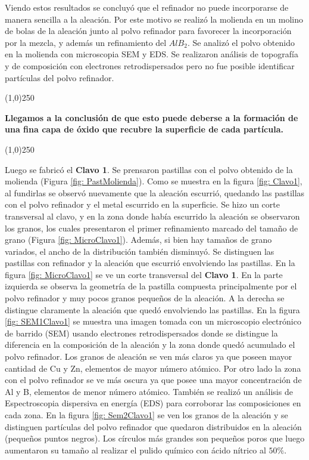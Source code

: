 \documentclass[a4paper,12pt,fleqn,twoside,openany]{book}
\begin{document}
Viendo estos resultados se concluyó que el refinador no puede incorporarse de manera sencilla a la aleación. Por este motivo se realizó la molienda en un molino de bolas de la aleación junto al polvo refinador para favorecer la incorporación por la mezcla, y además un refinamiento del $AlB_2$. Se analizó el polvo obtenido en la molienda con microscopia SEM y EDS. Se realizaron análisis de topografía y de composición con electrones retrodispersados pero no fue posible identificar partículas del polvo refinador. 

\begin{center}
\line(1,0){250}
\end{center}

\textbf{Llegamos a la conclusión de que esto puede deberse a la formación de una fina capa de óxido que recubre la superficie de cada partícula.} 

\begin{center}
\line(1,0){250}
\end{center}


Luego se fabricó el \textbf{Clavo 1}. Se prensaron pastillas con el polvo obtenido de la molienda (Figura \ref{fig: PastMolienda}). Como se muestra en la figura \ref{fig: Clavo1}, al fundirlas se observó nuevamente que la aleación escurrió, quedando las pastillas con el polvo refinador y el metal escurrido en la superficie. Se hizo un corte transversal al clavo, y en la zona donde había escurrido la aleación se observaron los granos, los cuales presentaron el primer refinamiento marcado del tamaño de grano (Figura \ref{fig: MicroClavo1}). Además, si bien hay tamaños de grano variados, el ancho de la distribución también disminuyó.  Se distinguen las pastillas con refinador y la aleación que escurrió envolviendo las pastillas. En la figura \ref{fig: MicroClavo1} se ve un corte transversal del \textbf{Clavo 1}. En la parte izquierda se observa la geometría de la pastilla compuesta principalmente por el polvo refinador y muy pocos granos pequeños de la aleación. A la derecha se distingue claramente la aleación que quedó envolviendo las pastillas. En la figura \ref{fig: SEM1Clavo1} se muestra una imagen tomada con un microscopio electrónico de barrido (SEM) usando electrones retrodispersados donde se distingue la diferencia en la composición de la aleación y la zona donde quedó acumulado el polvo refinador. Los granos de aleación se ven más claros ya que poseen mayor cantidad de Cu y Zn, elementos de mayor número atómico. Por otro lado la zona con el polvo refinador se ve más oscura ya que posee una mayor concentración de Al y B, elementos de menor número atómico. También se realizó un análisis de Espectroscopia dispersiva en energía (EDS) para corroborar las composiciones en cada zona. En la figura \ref{fig: Sem2Clavo1} se ven los granos de la aleación y se distinguen partículas del polvo refinador que quedaron distribuidos en la aleación (pequeños puntos negros). Los círculos más grandes son pequeños poros que luego aumentaron su tamaño al realizar el pulido químico con ácido nítrico al $50 \%$.
\end{document}
